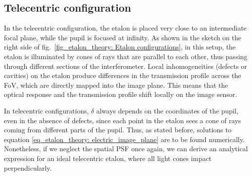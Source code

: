 \subsection{\label{susec_etalon_theory: Tele-perfe}Telecentric configuration}

In the telecentric configuration, the etalon is placed very close to an intermediate focal plane, while the pupil is focused at infinity. As shown in the sketch on the right side of fig.~{\ref{fig_etalon_theory: Etalon configurations}}, in this setup, the etalon is illuminated by cones of rays that are parallel to each other, thus passing through different sections of the interferometer. Local inhomogeneities (defects or cavities) on the etalon produce differences in the transmission profile across the FoV, which are directly mapped into the image plane. This means that the optical response and the transmission profile shift locally on the image sensor. 

In telecentric configurations, $\delta$ always depends on the coordinates of the pupil, even in the absence of defects, since each point in the etalon sees a cone of rays coming from different parts of the pupil. Thus, as stated before, solutions to equation \eqref{eq_etalon_theory: electric_image_plane} are to be found numerically. Nonetheless, if we neglect the spatial PSF once again, we can derive an analytical expression for an ideal telecentric etalon, where all light cones impact perpendicularly.

